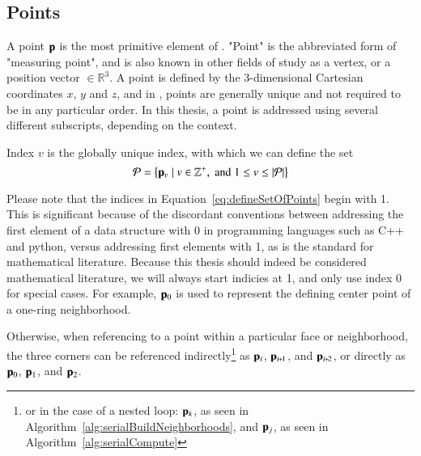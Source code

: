\subsection{Points}
\label{chBsP}
A point $\mathbf{p}$ is the most primitive element of \tdd{}. "Point" is the abbreviated form of "measuring point", and is also known in other fields of study as a vertex, or a position vector $\in \mathbb{R}^3$. A point is defined by the 3-dimensional Cartesian coordinates $x$, $y$ and $z$, and in \tdd{}, points are generally unique and not required to be in any particular order. In this thesis, a point is addressed using several different subscripts, depending on the context.

Index $v$ is the globally unique index, with which we can define the set
\begin{equation}
	\mathcal{P} = \left \{\mathbf{p}_v \mid v \in \mathbb{Z}^+, \;\text{and}\; 1\leq v \leq|\mathcal{P}| \right \}
	\label{eq:defineSetOfPoints}
\end{equation}%
%
%
%

Please note that the indices in Equation~\ref{eq:defineSetOfPoints} begin with 1. This is significant because of the discordant conventions between addressing the first element of a data structure with 0 in programming languages such as C++ and python, versus addressing first elements with 1, as is the standard for mathematical literature. Because this thesis should indeed be considered mathematical literature, we will always start indicies at 1, and only use index 0 for special cases. For example, $\mathbf{p}_0$ is used to represent the defining center point of a one-ring neighborhood.

Otherwise,
 when referencing to a point within a particular face or neighborhood, the three corners can be referenced indirectly\footnote{or in the case of a nested loop: $\mathbf{p}_k$, as seen in Algorithm~\ref{alg:serialBuildNeighborhoods}, and $\mathbf{p}_j$, as seen in Algorithm~\ref{alg:serialCompute}} as $\mathbf{p}_i$, $\bp_{\sipo}$, and $\bp_{\sipt}$, or directly as $\mathbf{p}_0$, $\mathbf{p}_1$, and $\mathbf{p}_2$.%
%
%
~\cite[p.~25]{Mara12}%

